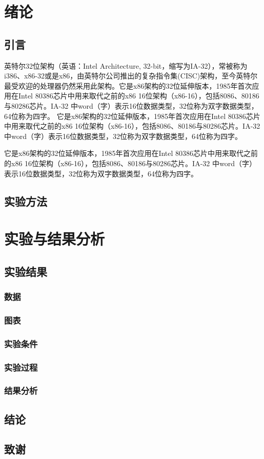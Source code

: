 \documentclass{book}
\begin{document}
	\tableofcontents %
	\chapter{绪论}
	\section{引言}
	英特尔32位架构（英语：Intel Architecture, 32-bit，缩写为IA-32），常被称为i386、x86-32或是x86，由英特尔公司推出的复杂指令集(CISC)架构，至今英特尔最受欢迎的处理器仍然采用此架构。它是x86架构的32位延伸版本，1985年首次应用在Intel 80386芯片中用来取代之前的x86 16位架构（x86-16），包括8086、80186与80286芯片。IA-32 中word（字）表示16位数据类型，32位称为双字数据类型，64位称为四字。
	它是x86架构的32位延伸版本，1985年首次应用在Intel 80386芯片中用来取代之前的x86 16位架构（x86-16），包括8086、80186与80286芯片。IA-32 中word（字）表示16位数据类型，32位称为双字数据类型，64位称为四字。
	
	 它是x86架构的32位延伸版本，1985年首次应用在Intel 80386芯片中用来取代之前的x86 16位架构（x86-16），包括8086、80186与80286芯片。IA-32 中word（字）表示16位数据类型，32位称为双字数据类型，64位称为四字。

	
	
	\section{实验方法}
	\chapter{实验与结果分析}
	\section{实验结果}
		\subsection{数据} %
		\subsection{图表}
		\subsection{实验条件}
		\subsection{实验过程}
		\subsection{结果分析}
	\section{结论}	
	\section{致谢}
\end{document}
